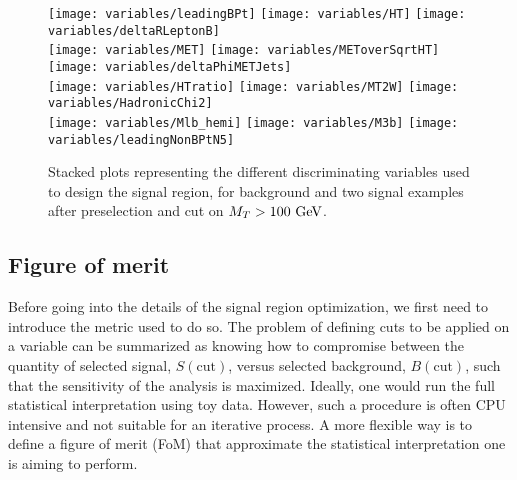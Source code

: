             \begin{figure}[h!]
                \centering
                \texttt{[image: variables/leadingBPt]}
                \texttt{[image: variables/HT]}
                \texttt{[image: variables/deltaRLeptonB]}\\
                \texttt{[image: variables/MET]}
                \texttt{[image: variables/METoverSqrtHT]}
                \texttt{[image: variables/deltaPhiMETJets]}\\
                \texttt{[image: variables/HTratio]}
                \texttt{[image: variables/MT2W]}
                \texttt{[image: variables/HadronicChi2]}\\
                \texttt{[image: variables/Mlb\_hemi]}
                \texttt{[image: variables/M3b]}
                \texttt{[image: variables/leadingNonBPtN5]}
                \caption{Stacked plots representing the different discriminating variables used to design the signal region, for background and two signal examples after preselection and cut on $M_T > 100 ~\text{GeV}$.}
                \label{fig:variables}
            \end{figure}

            \subsection{Figure of merit}

            Before going into the details of the signal region optimization, we first need to introduce the
            metric used to do so. The problem of defining cuts to be applied on a variable can be summarized 
            as knowing how to compromise between the quantity of selected signal, $S(\text{cut})$, versus selected
            background, $B(\text{cut})$, such that the sensitivity of the analysis is maximized. Ideally,
            one would run the full statistical interpretation using toy data. However, such a procedure 
            is often CPU intensive and not suitable for an iterative process. A more flexible way is
            to define a figure of merit (FoM) that approximate the statistical interpretation one is aiming
            to perform.

